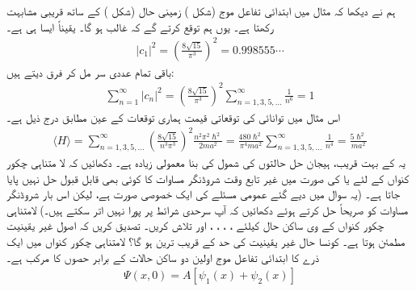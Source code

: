 ہم نے دیکھا  کہ مثال  میں ابتدائی تفاعل موج (شکل )  زمینی حال  (شکل ) کے ساتھ قریبی مشابہت رکھتا ہے۔ یوں ہم توقع کرتے گے کہ   غالب ہو گا۔ یقیناً ایسا ہی ہے۔
\begin{align*}
\left| c_{1} \right|^{2} = \left( \frac{8\sqrt{15}}{\pi^{3}} \right)^{2} = 0.998555 \cdots
\end{align*}
باقی تمام عددی سر مل کر فرق دیتے ہیں:
\begin{align*}
\sum_{n=1}^{\infty} \left| c_{n} \right|^{2} = \left( \frac{8\sqrt{15}}{\pi^{3}} \right)^{2} \sum_{n=1,3,5,...}^{\infty} \frac{1}{n^{6}} = 1
\end{align*}
اس مثال میں توانائی کی توقعاتی قیمت ہماری توقعات کے عین مطابق درج ذیل ہے۔
\begin{align*}
\langle H \rangle = \sum_{n=1,3,5,...}^{\infty} \left( \frac{8\sqrt{15}}{n^{3} \pi^{3}} \right)^{2} \frac{n^{2} \pi^{2} \hslash^{2}}{2ma^{2}} = \frac{480\hslash^{2}}{\pi^{4} ma^{2}} \sum_{n=1,3,5,...}^{\infty} \frac{1}{n^{4}} = \frac{5 \hslash^{2}}{ma^{2}}
\end{align*}
 یہ  کے بہت قریب،  ہیجان حل حالتوں کی شمول کی بنا معمولی زیادہ ہے۔ 
دکھائیں کہ لا متناہی چکور  کنواں کے لئے   یا  کی صورت میں  غیر تابع وقت شروڈنگر مساوات کا کوئی بھی قابل قبول حل  نہیں پایا جاتا ہے۔ (یہ سوال  میں دیے گئے عمومی مسئلے کی ایک خصوصی صورت ہے، لیکن اس بار شروڈنگر مساوات کو صریحاً حل کرتے ہوئے دکھائیں کہ آپ سرحدی شرائط پر پورا نہیں اتر سکتے ہیں۔)
لامتناہی چکور  کنواں کے  وی ساکن حال کیلئے ،  ، ، ،   اور   تلاش کریں۔ تصدیق کریں کہ اصول غیر یقینیت مطمئن ہوتا ہے۔ کونسا حال غیر یقینیت کی حد کے قریب ترین ہو گا؟
لامتناہی چکور  کنواں میں ایک ذرے کا ابتدائی تفاعل موج اولین دو ساکن حالات کے برابر حصوں کا مرکب ہے۔ 
\begin{align*}
\Psi(x,0) = A[\psi_{1}(x) + \psi_{2}(x)]
\end{align*}
